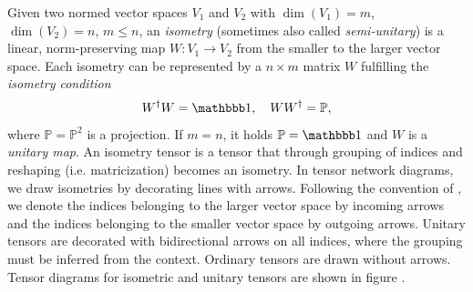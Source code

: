Given two normed vector spaces $V_1$ and $V_2$ with $\dim\left(V_1\right) = m$, $\dim\left(V_2\right) = n$, $m \le n$, an \textit{isometry} (sometimes also called \textit{semi-unitary}) is a linear, norm-preserving map $W: V_1 \rightarrow V_2$ from the smaller to the larger vector space. Each isometry can be represented by a $n\times m$ matrix $W$ fulfilling the \textit{isometry condition}
\begin{equation}
	\label{eq:isometry_condition_general}
	W^\dagger W = \id, \quad WW^\dagger = \mathbb{P},
\end{equation}
where $\mathbb{P} = \mathbb{P}^2$ is a projection. If $m = n$, it holds $\mathbb{P} = \id$ and $W$ is a \textit{unitary map}. An isometry tensor is a tensor that through grouping of indices and reshaping (i.e. matricization) becomes an isometry. In tensor network diagrams, we draw isometries by decorating lines with arrows. Following the convention of \cite{cite:isometric_tensor_network_states_in_two_dimensions, cite:efficient_simulation_of_dynamics_in_two_dimensional_quantum_spin_systems}, we denote the indices belonging to the larger vector space by incoming arrows and the indices belonging to the smaller vector space by outgoing arrows. Unitary tensors are decorated with bidirectional arrows on all indices, where the grouping must be inferred from the context. Ordinary tensors are drawn without arrows. Tensor diagrams for isometric and unitary tensors are shown in figure .\par
